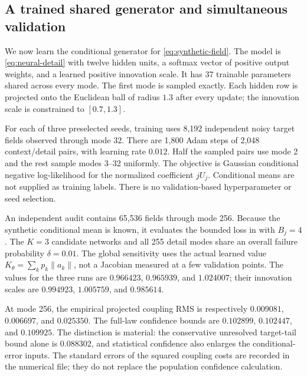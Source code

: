 \subsection{A trained shared generator and simultaneous validation}\label{sec:learned-experiment}
We now learn the conditional generator for \eqref{eq:synthetic-field}. The model is \eqref{eq:neural-detail} with twelve hidden units, a softmax vector of positive output weights, and a learned positive innovation scale. It has 37 trainable parameters shared across every mode. The first mode is sampled exactly. Each hidden row is projected onto the Euclidean ball of radius $1.3$ after every update; the innovation scale is constrained to $[0.7,1.3]$.

For each of three preselected seeds, training uses 8,192 independent noisy target fields observed through mode 32. There are 1,800 Adam steps of 2,048 context/detail pairs, with learning rate $0.012$. Half the sampled pairs use mode 2 and the rest sample modes 3--32 uniformly. The objective is Gaussian conditional negative log-likelihood for the normalized coefficient $jU_j$. Conditional means are not supplied as training labels. There is no validation-based hyperparameter or seed selection.

An independent audit contains 65,536 fields through mode 256. Because the synthetic conditional mean is known, it evaluates the bounded loss in  with $B_j=4$. The $K=3$ candidate networks and all 255 detail modes share an overall failure probability $\delta=0.01$. The global sensitivity uses the actual learned value $K_\theta=\sum_kp_k\|a_k\|$, not a Jacobian measured at a few validation points. The values for the three runs are $0.966423$, $0.965939$, and $1.024007$; their innovation scales are $0.994923$, $1.005759$, and $0.985614$.

\begin{table}[htbp]
\centering\small

\caption{The first preselected training seed. Coupling RMS is an empirical cost to the 256-mode target reference, and estimated $d_m$ plugs empirical conditional errors into the recurrence. The last two columns use simultaneous 99-percent conditional-error bounds; only the final column also includes the infinite target tail.}\label{tab:learned}
\end{table}

At mode 256, the empirical projected coupling RMS is respectively $0.009081$, $0.006697$, and $0.025350$. The full-law confidence bounds are $0.102899$, $0.102447$, and $0.109925$. The distinction is material: the conservative unresolved target-tail bound alone is $0.088302$, and statistical confidence also enlarges the conditional-error inputs. The standard errors of the squared coupling costs are recorded in the numerical file; they do not replace the population confidence calculation.

